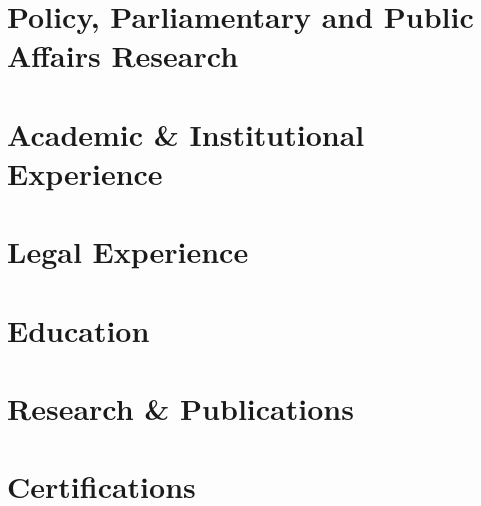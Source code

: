 \documentclass[11pt,letterpaper]{article}
\begin{document}
\section{Policy, Parliamentary and Public Affairs Research}


\section{Academic & Institutional Experience}


\section{Legal Experience}


\section{Education}


\section{Research \& Publications}


\section{Certifications}

\end{document}
